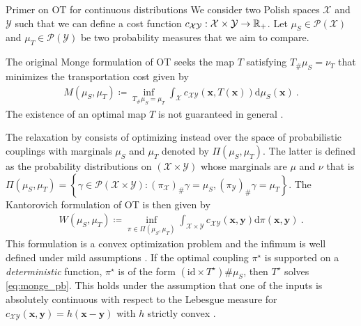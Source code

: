 \begin{mem1}{Primer on OT for continuous distributions}
    We consider two Polish spaces $\mathcal{X}$ and $\mathcal{Y}$ such that we can define a cost function $c_{\mathcal{X} \mathcal{Y}} : \mathcal{X} \times \mathcal{Y} \to \mathbb{R}_+$. Let $\mu_S \in \mathcal{P}(\mathcal{X})$ and $\mu_T \in \mathcal{P}(\mathcal{Y})$ be two probability measures that we aim to compare.

    The original Monge formulation \citep{monge1781memoire} of OT seeks the map $T$ satisfying $T_{\#}\mu_S = \nu_T$ that minimizes the transportation cost given by
    \begin{align}\label{eq:monge_pb_continuous}
        M(\mu_S, \mu_T) \coloneqq \inf_{T_{\#}\mu_S = \mu_T} \int_{\mathcal{X}} c_{\mathcal{X} \mathcal{Y}}(\bm{x}, T(\bm{x})) \mathrm{d}\mu_S(\bm{x}) \:.
    \end{align}
    The existence of an optimal map $T$ is not guaranteed in general \citep{santambrogio2015optimal}.
    
    The relaxation by \citep{kantorovich1942translocation} consists of optimizing instead over the space of probabilistic couplings with marginals $\mu_S$ and $\mu_T$ denoted by $\Pi(\mu_S, \mu_T)$. The latter is defined as the probability distributions on $(\mathcal{X} \times \mathcal{Y})$ whose marginals are $\mu$ and $\nu$ that is $\Pi(\mu_S, \mu_T) = \left\{ \gamma \in \mathcal{P}(\mathcal{X} \times \mathcal{Y}) : (\pi_{\mathcal{X}})_\# \gamma = \mu_S, (\pi_{\mathcal{Y}})_\# \gamma = \mu_T \right\}$.
    The Kantorovich formulation of OT is then given by
    \begin{align}\label{eq:Wasserstein}
        W(\mu_S, \mu_T) \coloneqq \inf_{\pi \in \Pi(\mu_S, \mu_T)} \int_{\mathcal{X} \times \mathcal{Y}} c_{\mathcal{X} \mathcal{Y}}(\bm{x}, \bm{y}) \mathrm{d}\pi(\bm{x}, \bm{y}) \:.
    \end{align}
    This formulation is a convex optimization problem and the infimum is well
    defined under mild assumptions \citep{santambrogio2015optimal}. If the optimal
    coupling $\pi^\star$ is supported on a \emph{deterministic} function, \ie
    $\pi^\star$ is of the form $(\mathrm{id} \times T^\star)\# \mu_S$, then
    $T^\star$ solves \eqref{eq:monge_pb}. This holds under the assumption that one
    of the inputs is absolutely continuous with respect to the Lebesgue measure
    for $c_{\mathcal{X} \mathcal{Y}}(\bm{x}, \bm{y}) = h(\bm{x} - \bm{y})$ with
    $h$ strictly convex \citep{gangbo1996geometry}.
    
    \end{mem1}

